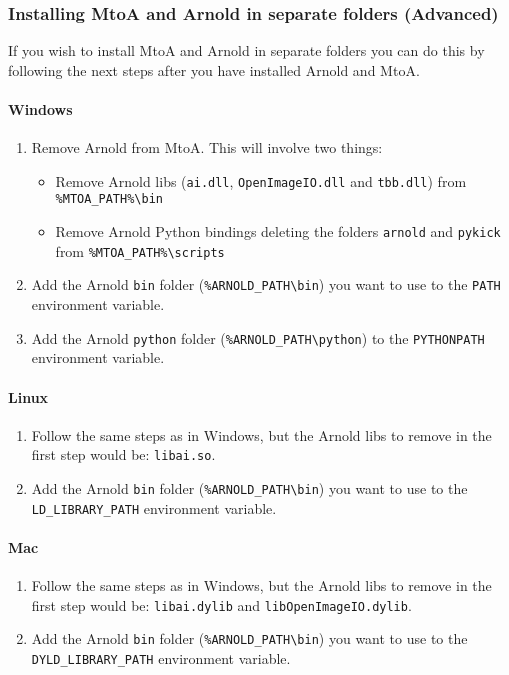 \subsubsection{Installing MtoA and Arnold in separate folders (Advanced)}
If you wish to install MtoA and Arnold in separate folders you can do this by following the next steps
after you have installed Arnold and MtoA.
\paragraph{Windows}
\begin{enumerate}
\item Remove Arnold from MtoA. This will involve two things:
\begin{itemize}
   \item Remove Arnold libs (\texttt{ai.dll}, \texttt{OpenImageIO.dll} and \texttt{tbb.dll}) from \texttt{\%MTOA\_PATH\%\textbackslash bin}
   \item Remove Arnold Python bindings deleting the folders \texttt{arnold} and \texttt{pykick} from \texttt{\%MTOA\_PATH\%\textbackslash scripts}
\end{itemize}
\item Add the Arnold \texttt{bin} folder (\texttt{\%ARNOLD\_PATH\textbackslash bin}) you want to use to the \texttt{PATH} environment variable.
\item Add the Arnold \texttt{python} folder (\texttt{\%ARNOLD\_PATH\textbackslash python}) to the \texttt{PYTHONPATH} environment variable.
\end{enumerate}

\paragraph{Linux}
\begin{enumerate}
\item Follow the same steps as in Windows, but the Arnold libs to remove in the first step would be: \texttt{libai.so}.
\item Add the Arnold \texttt{bin} folder (\texttt{\%ARNOLD\_PATH\textbackslash bin}) you want to use to the \texttt{LD\_LIBRARY\_PATH} environment variable.
\end{enumerate}

\paragraph{Mac}
\begin{enumerate}
\item Follow the same steps as in Windows, but the Arnold libs to remove in the first step would be: \texttt{libai.dylib} and \texttt{libOpenImageIO.dylib}.
\item Add the Arnold \texttt{bin} folder (\texttt{\%ARNOLD\_PATH\textbackslash bin}) you want to use to the \texttt{DYLD\_LIBRARY\_PATH} environment variable.
\end{enumerate}

